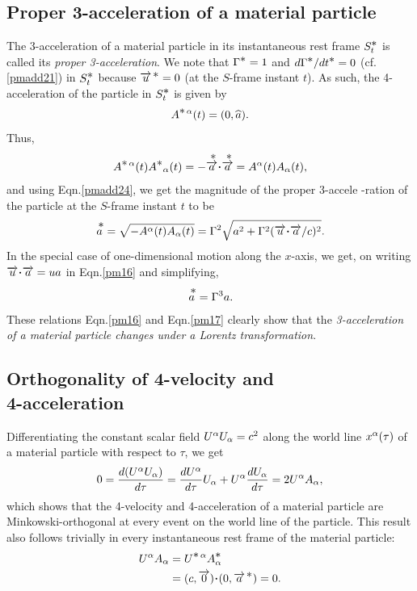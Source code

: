 \subsection{Proper 3-acceleration of a  material 
particle}
The 3-acceleration of a material particle in its 
instantaneous rest frame $S^{{\textstyle \ast}}_t$ is called its 
\textsl{proper 3-acceleration}. We note that 
$\Gamma^{\textstyle \ast}=1$ 
and $d\Gamma^{\textstyle \ast}/dt^{{\textstyle \ast}}=0$ (cf. \eqref{pmadd21}) 
in 
$S^{{\textstyle \ast}}_t$ because ${\overrightarrow{u}^{\,{\textstyle \ast}}} = 0$  (at the $S$-frame 
instant $t$).  As such, the 4-acceleration of the 
particle 
in $S^{{\textstyle \ast}}_t$ is given by
\begin{align}\label{pm14}
{A}^{{\textstyle \ast}\,{\alpha}}(t)= (0, {{\widehat{a}}}).
\end{align}
Thus,
\begin{align}\label{pm15}
{A}^{\bst\,\gka}(t){A^\bst}_{\gka} (t)=-\ustar{
\veca{a}}\dotp
\ustar{\veca{a}} =A^\gka (t) A_ \gka (t),
\end{align}
and using Eqn.\eqref{pmadd24}, we get the magnitude of 
the 
proper 3-accele  -ration of the particle at the 
$S$-frame 
instant $t$ to be
\begin{align}\label{pm16}
\ustar{a}=\sqrt{-A^\gka(t)A_ \gka(t)}=\Gamma^2 
\sqrt{a^2 +\Gamma^2(\veca{u}\dotp\veca{a }/c)^2}.
\end{align}
In the special case of one-dimensional motion along 
the 
$x$-axis, we get, on writing  
$\veca{u}\dotp\veca{a}=ua$ in 
Eqn.\eqref{pm16} and simplifying,
\begin{align}\label{pm17}
\overset{{\,\,{\textstyle \ast}}}{a}=\Gamma^3 a.
\end{align}
These relations Eqn.\eqref{pm16} and Eqn.\eqref{pm17} 
clearly show  that the \textsl{3-acceleration of a 
material 
particle changes under a Lorentz transformation}.

\subsection{Orthogonality of 4-velocity and\\ 
4-acceleration}
Differentiating the constant scalar field  $U^{{\alpha}} U_ 
{{\alpha}} =c^2$ along the world line  $x^{{\alpha}}(\tau)$ of a 
material particle with respect to  $\tau $, we get
\begin{align}\label{pm18}
0=\frac{d(U^{{\alpha}}  U_ {{\alpha}})}{d\tau}
=\frac{dU^{{\alpha}}}{d\tau} U_ {{\alpha}}
+U^{{\alpha}} \frac{dU_ {{\alpha}}}{d\tau}
=2U^{{\alpha}} A_ {{\alpha}},
\end{align}
which shows that the {4-velocity and 4-acceleration of 
a 
material particle are Minkowski-orthogonal} at every  
event on the world line of the particle. This result 
also 
follows trivially in every instantaneous rest frame of 
the 
material particle:
\begin{align}\label{pm19}
U^\gka A_ \gka &= U^{\bst\, \gka}A^{\bst}_\gka\notag\\ 
&= (c,\veca{0})\dotp(0,\svec{a}) =0.
\end{align}

